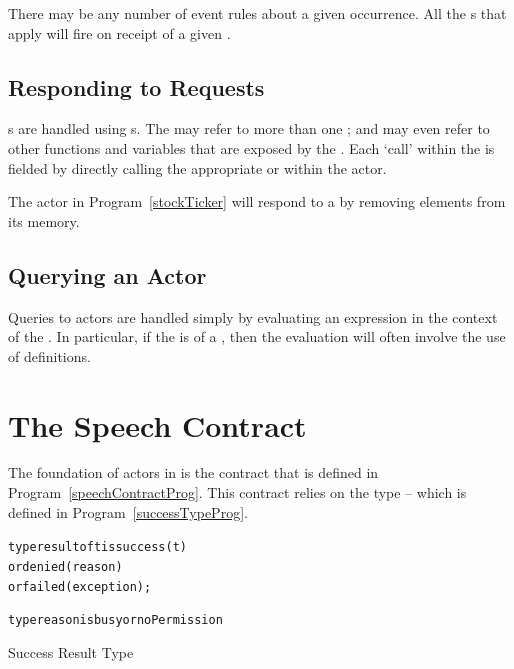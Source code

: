 There may be any number of event rules about a given occurrence. All the s that apply will fire on receipt of a given .


\subsection{Responding to Requests}
\label{requestResponse}

s are handled using s. The  may refer to more than one ; and may even refer to other functions and variables that are exposed by the . Each `call' within the  is fielded by directly calling the appropriate  or  within the actor.


The  actor in Program~\vref{stockTicker} will respond to a   by removing elements from its memory.


\subsection{Querying an Actor}
\label{actorQuery}

Queries to actors are handled simply by evaluating an expression in the context of the . In particular, if the  is of a , then the evaluation will often involve the use of  definitions.

\section{The Speech Contract}
\label{speechContract}
The foundation of actors in \Sr is the  contract that is defined in Program~\vref{speechContractProg}. This contract relies on the  type -- which is defined in Program~\vref{successTypeProg}.

\begin{program}
\begin{alltt}
type result of t is success(t)
  or denied(reason)
  or failed(exception);

type reason is busy or noPermission
\end{alltt}
\caption{Success Result Type}
\label{successTypeProg}
\end{program}


